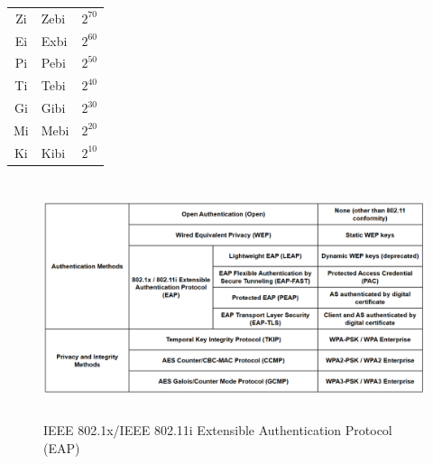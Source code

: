 \documentclass[12pt]{article}
\begin{document}
\begin{table}[H]
\begin{minipage}[t]{.45\linewidth}
\begin{tabular}{@{} c l l @{}}
	Zi	& Zebi	& $2^{70}$\\
	Ei	& Exbi	& $2^{60}$\\
	Pi	& Pebi	& $2^{50}$\\
	Ti 	& Tebi	& $2^{40}$\\
	Gi	& Gibi	& $2^{30}$\\
	Mi 	& Mebi	& $2^{20}$\\
	Ki	& Kibi	& $2^{10}$\\\hline
	\end{tabular}\end{minipage}\end{table}

	\begin{figure}[H]
	\centering
	\caption{IEEE 802.1x/IEEE 802.11i Extensible Authentication Protocol (EAP) \label{fig:WIRELESS SECURITY}}
	\includegraphics[width=\textwidth,height=7cm]{Wireless_Security}
	\end{figure}


\end{document}
